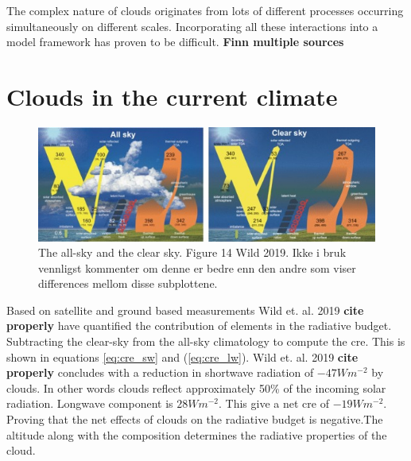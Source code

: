 \\ \\ 
The complex nature of clouds originates from lots of different processes occurring simultaneously on different scales. Incorporating all these interactions into a model framework has proven to be difficult. \textbf{Finn multiple sources} 

\section{Clouds in the current climate} \label{sec:intro_cloud_current_climate}
\begin{figure}[h] %
    \centering
    \includegraphics[scale = 7]{Chapter1_Intro/images/both_wild2019.jpg}
    \caption{The all-sky and the clear sky. Figure 14 Wild 2019. Ikke i bruk vennligst kommenter om denne er bedre enn den andre som viser differences mellom disse subplottene.}
    \label{fig:both_wild}
\end{figure}

Based on satellite and ground based measurements Wild et. al. 2019 \textbf{cite properly} have quantified the contribution of elements in the radiative budget. Subtracting the clear-sky from the all-sky climatology to compute the \acrfull{cre}. This is shown in equations \eqref{eq:cre_sw} and (\ref{eq:cre_lw}). Wild et. al. 2019 \textbf{cite properly} concludes with a reduction in shortwave radiation of $-47Wm^{-2}$ by clouds. In other words clouds reflect approximately 50\% of the incoming solar radiation. Longwave component is $28Wm^{-2}$. This give a net \acrshort{cre} of $-19Wm^{-2}$. Proving that the net effects of clouds on the radiative budget is negative.The altitude along with the composition determines the radiative properties of the cloud. 

